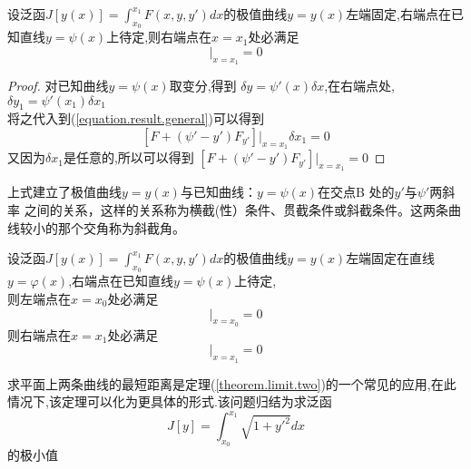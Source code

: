 \documentclass{book}
\begin{document}
\begin{theorem}
设泛函$J[y(x)]=\int_{x_0}^{x_1}F(x,y,y')dx$的极值曲线$y=y(x)$左端固定,右端点在已知直线$y=\psi(x)$上待定,则右端点在$x=x_1$处必满足
\begin{equation}
[F + (\psi' - y')F_{y'}]|_{x=x_1}=0
\end{equation}
\end{theorem}
\begin{proof}
 对已知曲线$y=\psi(x)$取变分,得到 $\delta y=\psi'(x)\delta x$,在右端点处,$\delta y_1=\psi'(x_1)\delta x_1$ \\
将之代入到(\ref{equation.result.general})可以得到
$$ [F + (\psi' - y')F_{y'}]|_{x=x_1}\delta x_1=0 $$
又因为$\delta x_1$是任意的,所以可以得到
$[F + (\psi' - y')F_{y'}]|_{x=x_1}=0$
\end{proof}
上式建立了极值曲线$y = y ( x )$与已知曲线：$y = \psi(x)$在交点B 处的$y'$与$\psi'$两斜率
之间的关系，这样的关系称为横截(性）条件、贯截条件或斜截条件。这两条曲线较小的那个交角称为斜截角。

\begin{theorem}
\label{theorem.limit.two}
设泛函$J[y(x)]=\int_{x_0}^{x_1}F(x,y,y')dx$的极值曲线$y=y(x)$左端固定在直线$y=\varphi(x)$,右端点在已知直线$y=\psi(x)$上待定,\\
则左端点在$x=x_0$处必满足
\begin{equation}
[F + (\varphi' - y')F_{y'}]|_{x=x_0}=0
\end{equation}
则右端点在$x=x_1$处必满足
\begin{equation}
[F + (\psi' - y')F_{y'}]|_{x=x_1}=0
\end{equation}
\end{theorem}
求平面上两条曲线的最短距离是定理(\ref{theorem.limit.two})的一个常见的应用,在此情况下,该定理可以化为更具体的形式.该问题归结为求泛函
$$J[y]=\int_{x_0}^{x_1}\sqrt{1+y'^2}dx$$的极小值
\end{document}
